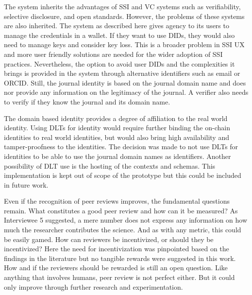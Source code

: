 The system inherits the advantages of \acrshort{SSI} and \acrshort{VC} systems such as verifiability, selective disclosure, and open standards. However, the problems of these systems are also inherited. The system as described here gives agency to its users to manage the credentials in a wallet. If they want to use \acrshort{DID}s, they would also need to manage keys and consider key loss. This is a broader problem in \acrshort{SSI} \acrshort{UX} and more user friendly solutions are needed for the wider adoption of \acrshort{SSI} practices. Nevertheless, the option to avoid user \acrshort{DID}s and the complexities it brings is provided in the system through alternative identifiers such as email or \acrshort{ORCID}. Still, the journal identity is based on the journal domain name and does nor provide any information on the legitimacy of the journal. A verifier also needs to verify if they know the journal and its domain name. 

The domain based identity provides a degree of affiliation to the real world identity. Using \acrshort{DLT}s for identity would require further binding the on-chain identities to real world identities, but would also bring high availability and tamper-proofness to the identities. The decision was made to not use \acrshort{DLT}s for identities to be able to use the journal domain names as identifiers. Another possibility of \acrshort{DLT} use is the hosting of the contexts and schemas. This implementation is kept out of scope of the prototype but this could be included in future work.

Even if the recognition of peer reviews improves, the fundamental questions remain. What constitutes a good peer review and how can it be measured? As Interviewee 5 suggested, a mere number does not express any information on how much the researcher contributes the science. And as with any metric, this could be easily gamed. How can reviewers be incentivized, or should they be incentivized? Here the need for incentivization was pinpointed based on the findings in the literature but no tangible rewards were suggested in this work. How and if the reviewers should be rewarded is still an open question. Like anything that involves humans, peer review is not perfect either. But it could only improve through further research and experimentation.